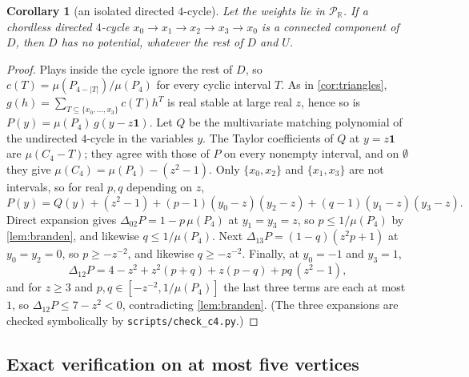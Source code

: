 \documentclass[11pt]{amsart}
\theoremstyle{plain}
\newtheorem{corollary}[theorem]{Corollary}
\theoremstyle{definition}
\theoremstyle{remark}
\numberwithin{equation}{section}
\newcommand{\code}[1]{{\ttfamily\nolinkurl{#1}}}
\newcommand{\RR}{\mathbb{R}}
\newcommand{\Puis}{\mathcal{P}_{\RR}}
\newcommand{\one}{\mathbf{1}}
\begin{document}
\begin{corollary}[an isolated directed $4$-cycle]\label{cor:c4}
Let the weights lie in $\Puis$. If a chordless directed $4$-cycle $x_0\to x_1\to x_2\to x_3\to x_0$ is a connected component of $D$, then $D$ has no potential, whatever the rest of $D$ and $U$.
\end{corollary}
\begin{proof}
Plays inside the cycle ignore the rest of $D$, so $c(T)=\mu(P_{4-|T|})/\mu(P_4)$ for every cyclic interval $T$. As in \cref{cor:triangles}, $g(h)=\sum_{T\subseteq\{x_0,\dots,x_3\}}c(T)h^T$ is real stable at large real $z$, hence so is $P(y)=\mu(P_4)\,g(y-z\one)$. Let $Q$ be the multivariate matching polynomial of the undirected $4$-cycle in the variables $y$. The Taylor coefficients of $Q$ at $y=z\one$ are $\mu(C_4-T)$; they agree with those of $P$ on every nonempty interval, and on $\emptyset$ they give $\mu(C_4)=\mu(P_4)-(z^2-1)$. Only $\{x_0,x_2\}$ and $\{x_1,x_3\}$ are not intervals, so for real $p,q$ depending on $z$,
\[
P(y)=Q(y)+(z^{2}-1)+(p-1)(y_0-z)(y_2-z)+(q-1)(y_1-z)(y_3-z).
\]
Direct expansion gives $\Delta_{02}P=1-p\,\mu(P_4)$ at $y_1=y_3=z$, so $p\le1/\mu(P_4)$ by \cref{lem:branden}, and likewise $q\le1/\mu(P_4)$. Next $\Delta_{13}P=(1-q)(z^{2}p+1)$ at $y_0=y_2=0$, so $p\ge-z^{-2}$, and likewise $q\ge-z^{-2}$. Finally, at $y_0=-1$ and $y_3=1$,
\[
\Delta_{12}P=4-z^{2}+z^{2}(p+q)+z(p-q)+pq\,(z^{2}-1),
\]
and for $z\ge3$ and $p,q\in[-z^{-2},1/\mu(P_4)]$ the last three terms are each at most $1$, so $\Delta_{12}P\le7-z^{2}<0$, contradicting \cref{lem:branden}. (The three expansions are checked symbolically by \code{scripts/check_c4.py}.)
\end{proof}

\subsection{Exact verification on at most five vertices}
\end{document}
